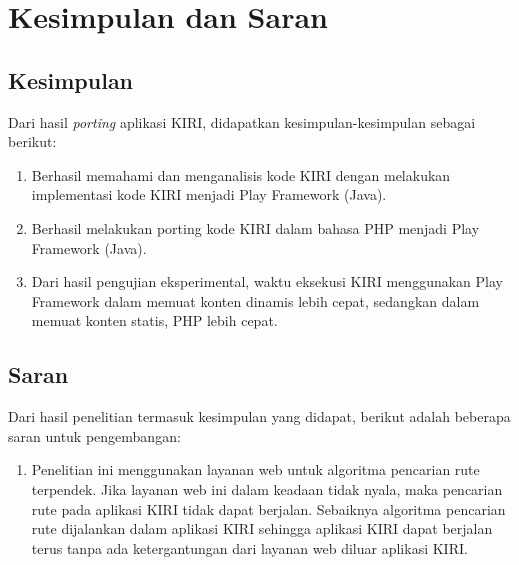 \chapter{Kesimpulan dan Saran}
\label{chap:kesimpulan_saran}

\section{Kesimpulan}
\label{sec:kesimpulan}

Dari hasil \textit{porting} aplikasi KIRI, didapatkan kesimpulan-kesimpulan sebagai berikut:
	\begin{enumerate}
		\item Berhasil memahami dan menganalisis kode KIRI dengan melakukan implementasi kode KIRI menjadi Play Framework (Java).
		\item Berhasil melakukan porting kode KIRI dalam bahasa PHP menjadi Play Framework (Java). 
		\item Dari hasil pengujian eksperimental, waktu eksekusi KIRI menggunakan Play Framework dalam memuat konten dinamis lebih cepat, sedangkan dalam memuat konten statis, PHP lebih cepat.
	\end{enumerate}

\section{Saran}
\label{sec:saran}
Dari hasil penelitian termasuk kesimpulan yang didapat, berikut adalah beberapa saran untuk pengembangan:
\begin{enumerate}
	\item Penelitian ini menggunakan layanan web untuk algoritma pencarian rute terpendek. Jika layanan web ini dalam keadaan tidak nyala, maka pencarian rute pada aplikasi KIRI tidak dapat berjalan. Sebaiknya algoritma pencarian rute dijalankan dalam aplikasi KIRI sehingga aplikasi KIRI dapat berjalan terus tanpa ada ketergantungan dari layanan web diluar aplikasi KIRI.
\end{enumerate}